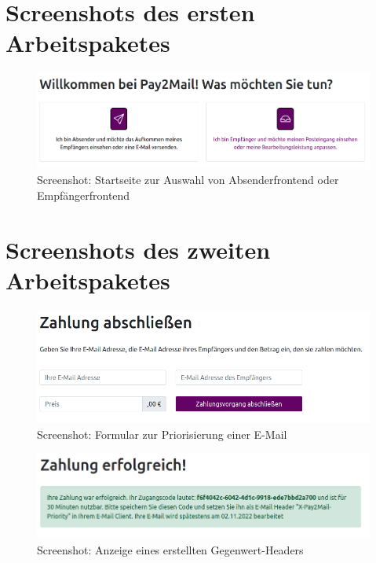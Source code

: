\newpage
\section{Screenshots des ersten Arbeitspaketes}

\begin{figure}[!h]
	\centering
		\includegraphics[width=1\textwidth]{Figures/overview.png}
	\caption[Screenshot: Startseite]{Screenshot: Startseite zur Auswahl von Absenderfrontend oder Empfängerfrontend}
	\label{fig:screenshot_overview}
\end{figure}

\newpage
\section{Screenshots des zweiten Arbeitspaketes}

\begin{figure}[!h]
	\centering
		\includegraphics[width=1\textwidth]{Figures/send_priority_new.png}
	\caption{Screenshot: Formular zur Priorisierung einer E-Mail}
	\label{fig:screenshot_send/priority_new}
\end{figure}

\begin{figure}[!h]
	\centering
		\includegraphics[width=1\textwidth]{Figures/send_priority_show.png}
	\caption{Screenshot: Anzeige eines erstellten Gegenwert-Headers}
	\label{fig:screenshot_send/priority_show}
\end{figure}

